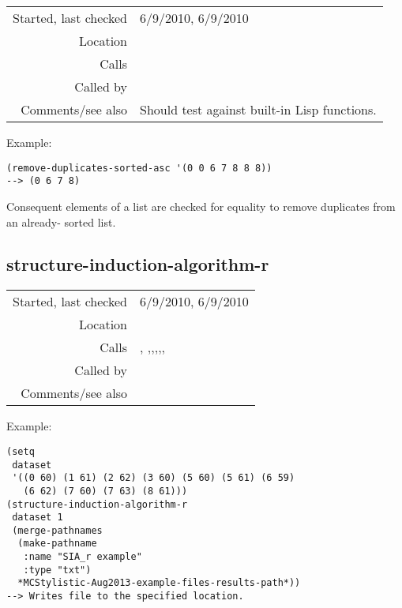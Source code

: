 \vspace{0.3cm}
\begin{tabular}{r|p{8cm}}
Started, last checked & 6/9/2010, 6/9/2010 \\
Location & \nameref{sec:superdiagonals} \\
Calls & \\
Called by & \nameref{fun:merge-sort-diff-sets-of-datapoints} \\
Comments/see also & Should test against built-in Lisp functions.
\end{tabular}

\vspace{0.5cm}
\noindent Example:
\begin{verbatim}
(remove-duplicates-sorted-asc '(0 0 6 7 8 8 8))
--> (0 6 7 8)
\end{verbatim}

\noindent Consequent elements of a list are checked
for equality to remove duplicates from an already-
sorted list.


\subsection*{structure-induction-algorithm-r}\label{fun:structure-induction-algorithm-r}

\vspace{0.3cm}
\begin{tabular}{r|p{8cm}}
Started, last checked & 6/9/2010, 6/9/2010 \\
Location & \nameref{sec:superdiagonals} \\
Calls & \nameref{fun:collect-by-cars}, \nameref{fun:frequency-count},\newline \nameref{fun:maximal-translatable-pattern},\newline \nameref{fun:merge-sort-by},\newline \nameref{fun:merge-sort-diff-sets-of-datapoints},\newline \nameref{fun:sort-dataset-asc},\newline \nameref{fun:subtractnretain-at-fixed-distances} \\
Called by & \\
Comments/see also & 
\end{tabular}

\vspace{0.5cm}
\noindent Example:
\begin{verbatim}
(setq
 dataset
 '((0 60) (1 61) (2 62) (3 60) (5 60) (5 61) (6 59)
   (6 62) (7 60) (7 63) (8 61)))
(structure-induction-algorithm-r
 dataset 1
 (merge-pathnames
  (make-pathname
   :name "SIA_r example"
   :type "txt")
  *MCStylistic-Aug2013-example-files-results-path*))
--> Writes file to the specified location.
\end{verbatim}

